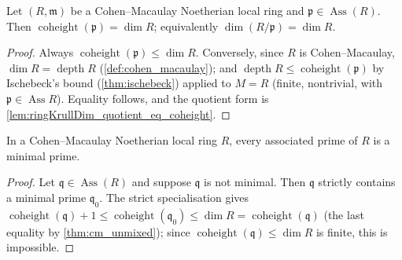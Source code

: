 \begin{theorem}
  \label{thm:cm_unmixed}
  \leanok
  Let \((R, \mathfrak m)\) be a Cohen--Macaulay Noetherian local ring and
  \(\mathfrak p \in \operatorname{Ass}(R)\). Then
  \(\operatorname{coheight}(\mathfrak p) = \dim R\); equivalently
  \(\dim(R/\mathfrak p) = \dim R\).
\end{theorem}
\begin{proof}
  \leanok
  Always \(\operatorname{coheight}(\mathfrak p) \le \dim R\). Conversely, since
  \(R\) is Cohen--Macaulay, \(\dim R = \operatorname{depth} R\)
  (\ref{def:cohen_macaulay}); and \(\operatorname{depth} R \le
  \operatorname{coheight}(\mathfrak p)\) by Ischebeck's bound (\ref{thm:ischebeck})
  applied to \(M = R\) (finite, nontrivial, with \(\mathfrak p \in
  \operatorname{Ass} R\)). Equality follows, and the quotient form is
  \ref{lem:ringKrullDim_quotient_eq_coheight}.
\end{proof}

\begin{theorem}
  \label{thm:cm_ass_minimal}
  \leanok
  In a Cohen--Macaulay Noetherian local ring \(R\), every associated prime of
  \(R\) is a minimal prime.
\end{theorem}
\begin{proof}
  \leanok
  Let \(\mathfrak q \in \operatorname{Ass}(R)\) and suppose \(\mathfrak q\) is not
  minimal. Then \(\mathfrak q\) strictly contains a minimal prime
  \(\mathfrak q_0\). The strict specialisation gives
  \(\operatorname{coheight}(\mathfrak q) + 1 \le \operatorname{coheight}(\mathfrak q_0)
  \le \dim R = \operatorname{coheight}(\mathfrak q)\) (the last equality by
  \ref{thm:cm_unmixed}); since \(\operatorname{coheight}(\mathfrak q) \le \dim R\)
  is finite, this is impossible.
\end{proof}

